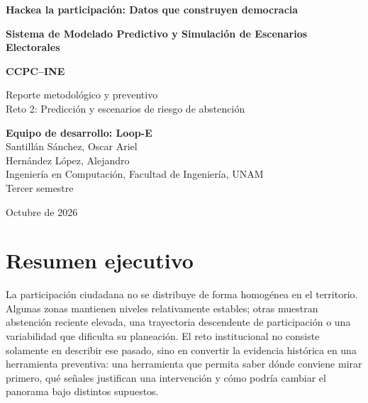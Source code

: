 \documentclass[11pt,a4paper]{article}
\begin{document}
\begin{titlepage}
\centering
\vspace*{0.3cm}
{\Large\color{ineblue}\textbf{Hackea la participación: Datos que construyen democracia}\par}
\vspace{0.5cm}
{\Huge\bfseries\color{ineblue}Sistema de Modelado Predictivo y Simulación de Escenarios Electorales\par}
\vspace{0.25cm}
{\Large\color{inecyan}\textbf{CCPC--INE}\par}
\vspace{0.6cm}
{\Large Reporte metodológico y preventivo\\Reto 2: Predicción y escenarios de riesgo de abstención\par}
\vfill
\begin{tcolorbox}[colback=lightblue,colframe=ineblue,width=0.88\textwidth]
\centering
\textbf{Equipo de desarrollo: Loop-E}\\[0.3em]
Santillán Sánchez, Oscar Ariel\\
Hernández López, Alejandro\\[0.3em]
Ingeniería en Computación, Facultad de Ingeniería, UNAM\\
Tercer semestre
\end{tcolorbox}
\vfill
{\large Octubre de 2026\par}
\end{titlepage}

\tableofcontents
\newpage
{}

\section*{Resumen ejecutivo}

La participación ciudadana no se distribuye de forma homogénea en el territorio. Algunas zonas mantienen niveles relativamente estables; otras muestran abstención reciente elevada, una trayectoria descendente de participación o una variabilidad que dificulta su planeación. El reto institucional no consiste solamente en describir ese pasado, sino en convertir la evidencia histórica en una herramienta preventiva: una herramienta que permita saber dónde conviene mirar primero, qué señales justifican una intervención y cómo podría cambiar el panorama bajo distintos supuestos.
\end{document}
